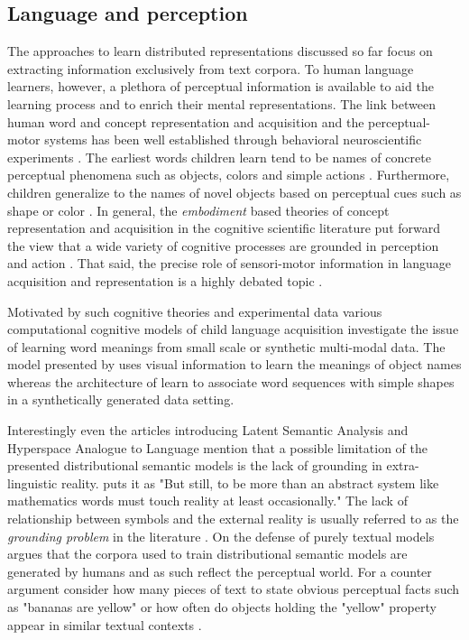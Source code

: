 \subsection{Language and perception}
\label{sec:langperc}

The approaches to learn distributed representations discussed so far focus on extracting information exclusively
from text corpora. To human language learners, however, a plethora of perceptual information is available to aid the
learning process and to enrich their mental representations. 
The link between human word and concept representation
and acquisition and the perceptual-motor systems has been well established through behavioral
neuroscientific experiments \citep{pulvermuller2005brain}.
The earliest words children learn tend to be names of concrete perceptual phenomena
such as objects, colors and simple actions \citep{bornstein2004cross}. Furthermore, children generalize to
the names of novel objects based on perceptual cues such as shape or color \citep{landau1998object}.
In general, the \emph{embodiment} based theories of concept representation and acquisition in the
cognitive scientific literature put forward the view that a wide variety of cognitive processes
are grounded in perception and action \citep{meteyard2008role}. That said, the precise role of
sensori-motor information in language acquisition and representation is a highly
debated topic \citep{meteyard2012coming}.

Motivated by such cognitive theories and experimental data 
various computational cognitive models of child 
language acquisition investigate the issue
of learning word meanings from small scale or synthetic multi-modal data. The model presented by
\cite{yu2005emergence} uses visual information to learn the meanings of object
names whereas the architecture of \cite{roy2002learning} learn to associate word sequences
with simple shapes in a synthetically generated data setting.

Interestingly even the articles introducing Latent Semantic Analysis
\citep{landauer1997solution} and Hyperspace Analogue to Language \citep{lund1996producing} mention
that a possible limitation of the presented distributional semantic models is the lack of
grounding in extra-linguistic reality. \cite{landauer1997solution} puts it as "But still, to be more than
an abstract system like mathematics words must touch reality at least occasionally."
The lack of relationship between symbols and the external reality is usually referred
to as the \emph{grounding problem} in the literature \citep{harnad1990symbol,perfetti1998limits}.
On the defense of purely textual models \cite{louwerse2011symbol} argues that the corpora
used to train distributional semantic models are generated by humans and as such reflect the perceptual world.
For a counter argument consider how many pieces of text to state obvious perceptual
facts such as "bananas are yellow" or how often do objects holding the "yellow" property
appear in similar textual contexts \citep{bruni2014multimodal}.

